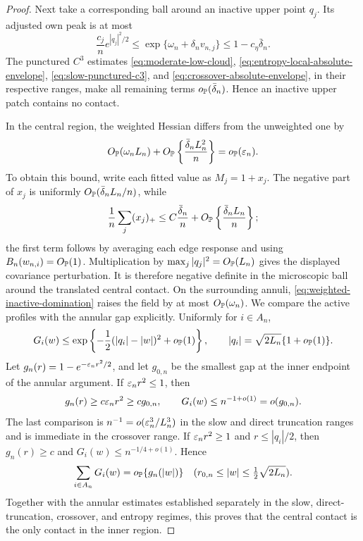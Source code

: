 \begin{proof}
Next take a corresponding ball around an inactive upper point \(q_j\).
Its adjusted own peak is at most
\[
 \frac{c_j}{n}e^{|q_j|^2/2}
 \le
 \exp\{\omega_n+\delta_nv_{n,j}\}
 \le1-c_\eta\bar\delta_n.
\]
The punctured \(C^3\) estimates
\eqref{eq:moderate-low-cloud},
\eqref{eq:entropy-local-absolute-envelope},
\eqref{eq:slow-punctured-c3}, and
\eqref{eq:crossover-absolute-envelope},
in their respective ranges, make all remaining terms
\(o_{\mathbb P}(\bar\delta_n)\).  Hence an inactive upper patch contains no
contact.

In the central region, the weighted Hessian differs from the unweighted
one by
\[
 O_{\mathbb P}(\omega_nL_n)
 +O_{\mathbb P}\left\{\frac{\bar\delta_nL_n^2}{n}\right\}
 =o_{\mathbb P}(\varepsilon_n).
\]
To obtain this bound, write each fitted value as \(M_j=1+x_j\).
The negative part of \(x_j\) is uniformly
\(O_{\mathbb P}(\bar\delta_nL_n/n)\), while
\[
 \frac1n\sum_j(x_j)_+
 \le
 C\frac{\bar\delta_n}{n}
 +O_{\mathbb P}\left\{\frac{\bar\delta_nL_n}{n}\right\};
\]
the first term follows by averaging each edge response and using
\(B_n(w_{n,i})=O_{\mathbb P}(1)\). Multiplication by
\(\max_j|q_j|^2=O_{\mathbb P}(L_n)\) gives the displayed covariance
perturbation.
It is therefore negative definite in the microscopic ball around the
translated central contact.  On the surrounding annuli,
\eqref{eq:weighted-inactive-domination} raises the field by at most
\(O_{\mathbb P}(\omega_n)\).  We compare the active profiles with the annular
gap explicitly.  Uniformly for \(i\in A_n\),
\[
 G_i(w)
 \le
 \exp\left\{-\frac12(|q_i|-|w|)^2+o_{\mathbb P}(1)\right\},
 \qquad
 |q_i|=\sqrt{2L_n}\{1+o_{\mathbb P}(1)\}.
\]
Let \(g_n(r)=1-e^{-\varepsilon_nr^2/2}\), and let \(g_{0,n}\) be the smallest
gap at the inner endpoint of the annular argument.  If
\(\varepsilon_nr^2\le1\), then
\[
 g_n(r)\ge c\varepsilon_nr^2\ge c g_{0,n},
 \qquad
 G_i(w)\le n^{-1+o(1)}=o(g_{0,n}).
\]
The last comparison is \(n^{-1}=o(\varepsilon_n^3/L_n^3)\) in the slow and
direct truncation ranges and is immediate in the crossover range. If
\(\varepsilon_nr^2\ge1\) and \(r\le|q_i|/2\), then \(g_n(r)\ge c\) and
\(G_i(w)\le n^{-1/4+o(1)}\).  Hence
\begin{equation}
\label{eq:active-central-corridor}
 \sum_{i\in A_n}G_i(w)=o_{\mathbb P}\{g_n(|w|)\}
 \quad
 (r_{0,n}\le|w|\le\tfrac12\sqrt{2L_n}).
\end{equation}
Together with the annular estimates established separately in the slow,
direct-truncation, crossover, and entropy regimes, this proves that the
central contact is the only contact in the inner region.


\end{proof}
